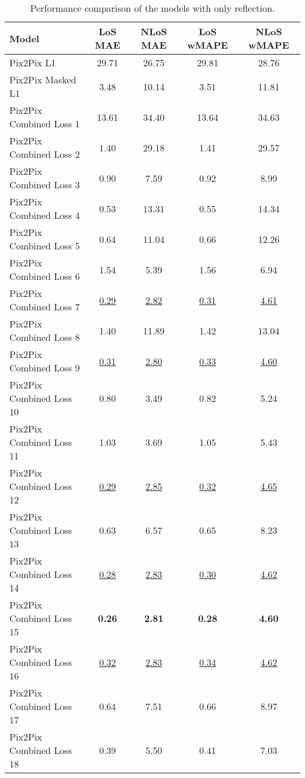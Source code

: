 		\begin{table}[h!]
			\centering
			\begin{tabular}{|l|c|c|c|c|}
				\hline
				\textbf{Model} & \textbf{LoS MAE} & \textbf{NLoS MAE} & \textbf{LoS wMAPE} & \textbf{NLoS wMAPE} \\
				\hline
				Pix2Pix L1 & 29.71 & 26.75 & 29.81 & 28.76 \\
				Pix2Pix Masked L1 & 3.48 & 10.14 & 3.51 & 11.81 \\
				Pix2Pix Combined Loss 1 & 13.61 & 34.40 & 13.64 & 34.63 \\
				Pix2Pix Combined Loss 2 & 1.40 & 29.18 & 1.41 & 29.57 \\
				Pix2Pix Combined Loss 3 & 0.90 & 7.59 & 0.92 & 8.99 \\
				Pix2Pix Combined Loss 4 & 0.53 & 13.31 & 0.55 & 14.34 \\
				Pix2Pix Combined Loss 5 & 0.64 & 11.04 & 0.66 & 12.26 \\
				Pix2Pix Combined Loss 6 & 1.54 & 5.39 & 1.56 & 6.94 \\
				Pix2Pix Combined Loss 7 & \underline{0.29} & \underline{2.82} & \underline{0.31} & \underline{4.61} \\
				Pix2Pix Combined Loss 8 & 1.40 & 11.89 & 1.42 & 13.04 \\
				Pix2Pix Combined Loss 9 & \underline{0.31} & \underline{2.80} & \underline{0.33} & \underline{4.60} \\
				Pix2Pix Combined Loss 10 & 0.80 & 3.49 & 0.82 & 5.24 \\
				Pix2Pix Combined Loss 11 & 1.03 & 3.69 & 1.05 & 5.43 \\
				Pix2Pix Combined Loss 12 & \underline{0.29} & \underline{2.85} & \underline{0.32} & \underline{4.65} \\
				Pix2Pix Combined Loss 13 & 0.63 & 6.57 & 0.65 & 8.23 \\
				Pix2Pix Combined Loss 14 & \underline{0.28} & \underline{2.83} & \underline{0.30} & \underline{4.62} \\
				Pix2Pix Combined Loss 15 & \textbf{0.26} & \textbf{2.81} & \textbf{0.28} & \textbf{4.60} \\
				Pix2Pix Combined Loss 16 & \underline{0.32} & \underline{2.83} & \underline{0.34} & \underline{4.62} \\
				Pix2Pix Combined Loss 17 & 0.64 & 7.51 & 0.66 & 8.97 \\
				Pix2Pix Combined Loss 18 & 0.39 & 5.50 & 0.41 & 7.03 \\
				\hline
			\end{tabular}
			\caption{Performance comparison of the models with only reflection.}
			\label{tab:experiment_reflection_only}
		\end{table}
		\FloatBarrier
		
